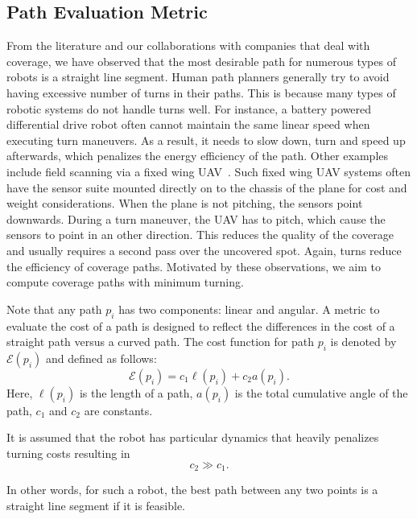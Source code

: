 \documentclass[../main.tex]{subfiles}
\begin{document}
\subsection{Path Evaluation Metric}
\label{subsection:path_cost_design}

From the literature and our collaborations with companies that deal with coverage, we have observed that the most desirable path for numerous types of robots is a straight line segment. Human path planners generally try to avoid having excessive number of turns in their paths. This is because many types of robotic systems do not handle turns well. For instance, a battery powered differential drive robot often cannot maintain the same linear speed when executing turn maneuvers. As a result, it needs to slow down, turn and speed up afterwards, which penalizes the energy efficiency of the path. Other examples include field scanning via a fixed wing UAV~\cite{frew2004vision}. Such fixed wing UAV systems often have the sensor suite mounted directly on to the chassis of the plane for cost and weight considerations. When the plane is not pitching, the sensors point downwards. During a turn maneuver, the UAV has to pitch, which cause the sensors to point in an other direction. This reduces the quality of the coverage and usually requires a second pass over the uncovered spot. Again, turns reduce the efficiency of coverage paths. Motivated by these observations, we aim to compute coverage paths with minimum turning.

Note that any path $p_i$ has two components: linear and angular. A metric to evaluate the cost of a path is designed to reflect the differences in the cost of a straight path versus a curved path. The cost function for path $p_i$ is denoted by $\mathcal{E}(p_i)$ and defined as follows:
\begin{equation}
	\mathcal{E}(p_i)=c_1\ell(p_i)+c_2a(p_i).
\end{equation}
Here, $\ell(p_i)$ is the length of a path, $a(p_i)$ is the total cumulative angle of the path, $c_1$ and $c_2$ are constants.

\begin{assumption}
It is assumed that the robot has particular dynamics that heavily penalizes turning costs resulting in
	\begin{equation}
		c_2 \gg c_1.
	\end{equation}
\end{assumption}
In other words, for such a robot, the best path between any two points is a straight line segment if it is feasible.
\end{document}
